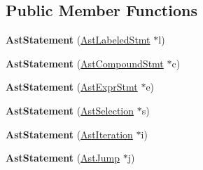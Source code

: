 \subsection*{Public Member Functions}
\begin{DoxyCompactItemize}
\item 
\hypertarget{classAstStatement_a51c4738b3eb4d0ce7f7937580827df49}{{\bfseries Ast\-Statement} (\hyperlink{classAstLabeledStmt}{Ast\-Labeled\-Stmt} $\ast$l)}\label{classAstStatement_a51c4738b3eb4d0ce7f7937580827df49}

\item 
\hypertarget{classAstStatement_a06ab5906e58059421ffca709140ad1b0}{{\bfseries Ast\-Statement} (\hyperlink{classAstCompoundStmt}{Ast\-Compound\-Stmt} $\ast$c)}\label{classAstStatement_a06ab5906e58059421ffca709140ad1b0}

\item 
\hypertarget{classAstStatement_a8a44969c79b381d9cef932fc93d99339}{{\bfseries Ast\-Statement} (\hyperlink{classAstExprStmt}{Ast\-Expr\-Stmt} $\ast$e)}\label{classAstStatement_a8a44969c79b381d9cef932fc93d99339}

\item 
\hypertarget{classAstStatement_a8bc036f0b37cacbfa99159e4c57207ec}{{\bfseries Ast\-Statement} (\hyperlink{classAstSelection}{Ast\-Selection} $\ast$s)}\label{classAstStatement_a8bc036f0b37cacbfa99159e4c57207ec}

\item 
\hypertarget{classAstStatement_ae26acf207adc2d426e558e5889b43b54}{{\bfseries Ast\-Statement} (\hyperlink{classAstIteration}{Ast\-Iteration} $\ast$i)}\label{classAstStatement_ae26acf207adc2d426e558e5889b43b54}

\item 
\hypertarget{classAstStatement_a80c754bbc909f7e2e7938e90485d7065}{{\bfseries Ast\-Statement} (\hyperlink{classAstJump}{Ast\-Jump} $\ast$j)}\label{classAstStatement_a80c754bbc909f7e2e7938e90485d7065}


\end{DoxyCompactItemize}
